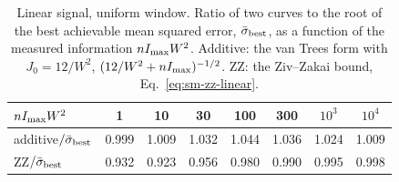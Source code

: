 \begin{table}[h]
\centering
\caption{Linear signal, uniform window. Ratio of two curves to the root of the best achievable mean squared error,
$\bar\sigma_{\rm best}$, as a function of the measured information $nI_{\rm max}W^2$. Additive: the van Trees form
with $J_0=12/W^2$, $(12/W^2+nI_{\rm max})^{-1/2}$. ZZ: the Ziv--Zakai bound, Eq.~\eqref{eq:sm-zz-linear}.}
\label{tab:sm-prior}
\begin{tabular}{lccccccc}
\hline
$nI_{\rm max}W^2$ & 1 & 10 & 30 & 100 & 300 & $10^3$ & $10^4$\\
\hline
additive$/\bar\sigma_{\rm best}$ & 0.999 & 1.009 & 1.032 & 1.044 & 1.036 & 1.024 & 1.009\\
ZZ$/\bar\sigma_{\rm best}$ & 0.932 & 0.923 & 0.956 & 0.980 & 0.990 & 0.995 & 0.998\\
\hline
\end{tabular}
\end{table}

